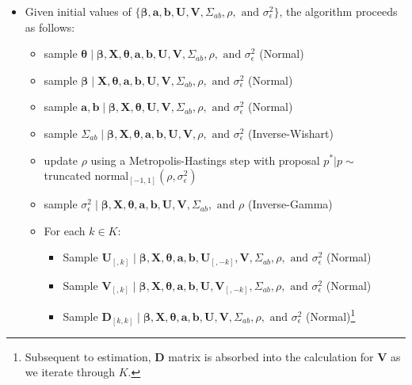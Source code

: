\begin{itemize}
 \item Given initial values of $\{\bm\beta, \textbf{a}, \textbf{b}, \textbf{U}, \textbf{V}, \Sigma_{ab}, \rho, \text{ and } \sigma_{\epsilon}^{2}\}$, the algorithm proceeds as follows:
 \begin{itemize}
 	\item sample $\bm\theta \; | \;  \bm\beta, \textbf{X}, \bm\theta, \textbf{a}, \textbf{b}, \textbf{U}, \textbf{V}, \Sigma_{ab}, \rho, \text{ and } \sigma_{\epsilon}^{2}$ (Normal)
 	\item sample $\bm\beta \; | \;  \textbf{X}, \bm\theta, \textbf{a}, \textbf{b}, \textbf{U}, \textbf{V}, \Sigma_{ab}, \rho, \text{ and } \sigma_{\epsilon}^{2}$ (Normal)
 	\item sample $\textbf{a}, \textbf{b} \; | \; \bm\beta, \textbf{X}, \bm\theta, \textbf{U}, \textbf{V}, \Sigma_{ab}, \rho, \text{ and } \sigma_{\epsilon}^{2}$ (Normal)
	\item sample $\Sigma_{ab} \; | \; \bm\beta, \textbf{X}, \bm\theta, \textbf{a}, \textbf{b}, \textbf{U}, \textbf{V}, \rho, \text{ and } \sigma_{\epsilon}^{2}$ (Inverse-Wishart)
 	\item update $\rho$ using a Metropolis-Hastings step with proposal $p^{*} | p  \sim$ truncated normal$_{[-1,1]}(\rho, \sigma_{\epsilon}^{2})$
 	\item sample $\sigma_{\epsilon}^{2} \; | \; \bm\beta, \textbf{X}, \bm\theta, \textbf{a}, \textbf{b}, \textbf{U}, \textbf{V}, \Sigma_{ab}, \text{ and } \rho$ (Inverse-Gamma)
 	\item For each $k \in K$:
 	\begin{itemize}
 		\item Sample $\textbf{U}_{[,k]} \; | \; \bm\beta, \textbf{X}, \bm\theta, \textbf{a}, \textbf{b}, \textbf{U}_{[,-k]}, \textbf{V}, \Sigma_{ab}, \rho, \text{ and } \sigma_{\epsilon}^{2}$ (Normal)
 		\item Sample $\textbf{V}_{[,k]} \; | \; \bm\beta, \textbf{X}, \bm\theta, \textbf{a}, \textbf{b}, \textbf{U}, \textbf{V}_{[,-k]}, \Sigma_{ab}, \rho, \text{ and } \sigma_{\epsilon}^{2}$ (Normal)
 		\item Sample $\textbf{D}_{[k,k]}  \; | \; \bm\beta, \textbf{X}, \bm\theta, \textbf{a}, \textbf{b}, \textbf{U}, \textbf{V}, \Sigma_{ab}, \rho, \text{ and } \sigma_{\epsilon}^{2}$ (Normal)\footnote{Subsequent to estimation, \textbf{D} matrix is absorbed into the calculation for $\textbf{V}$ as we iterate through $K$. }
 	\end{itemize}
 \end{itemize}
\end{itemize}
